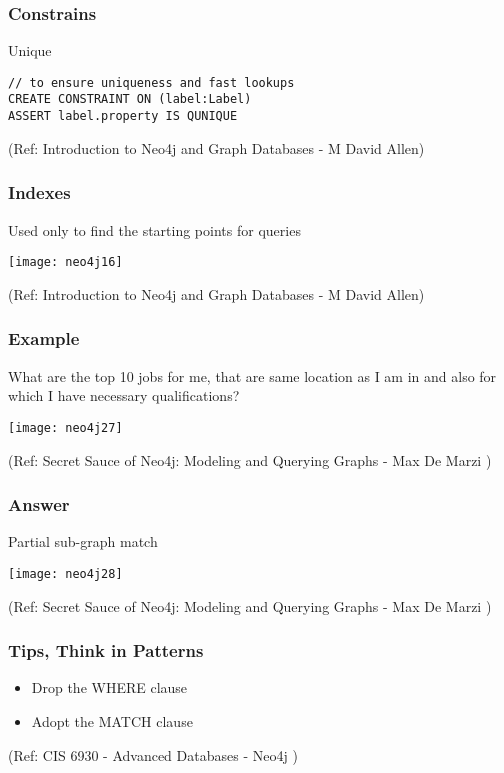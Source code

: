 \begin{frame}[fragile]\frametitle{Constrains}
Unique

\begin{lstlisting}
// to ensure uniqueness and fast lookups
CREATE CONSTRAINT ON (label:Label)
ASSERT label.property IS QUNIQUE
\end{lstlisting}	  

{\tiny (Ref: Introduction to Neo4j and Graph Databases
 - M David Allen)}

\end{frame}

\begin{frame}[fragile]\frametitle{Indexes}
Used only to find the starting points for queries

\begin{center}
\texttt{[image: neo4j16]}
\end{center}	  


{\tiny (Ref: Introduction to Neo4j and Graph Databases
 - M David Allen)}

\end{frame}

\begin{frame}[fragile]\frametitle{Example}
What are the top 10 jobs for me, that are same location as I am in and also for which I have necessary qualifications?

\begin{center}
\texttt{[image: neo4j27]}
\end{center}	    



{\tiny (Ref: Secret Sauce of Neo4j: Modeling and Querying Graphs
 - Max De Marzi )}

\end{frame}

\begin{frame}[fragile]\frametitle{Answer}

Partial sub-graph match

\begin{center}
\texttt{[image: neo4j28]}
\end{center}	    


{\tiny (Ref: Secret Sauce of Neo4j: Modeling and Querying Graphs
 - Max De Marzi )}

\end{frame}

\begin{frame}\frametitle{Tips, Think in Patterns}


\begin{itemize}
\item  Drop the WHERE clause
\item  Adopt the MATCH clause
\end{itemize}


{\tiny (Ref: CIS 6930 - Advanced Databases - Neo4j )}
\end{frame}





